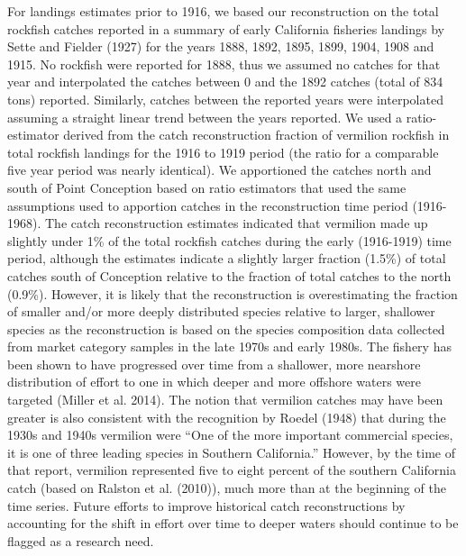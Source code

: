 \documentclass[11pt,
  english,
  a4paper,
]{article}
\begin{document}
For landings estimates prior to 1916, we based our reconstruction on the total rockfish catches reported in a summary of early California fisheries landings by Sette and Fielder {(1927)\leavevmode\tagmcend\tagstructend} for the years 1888, 1892, 1895, 1899, 1904, 1908 and 1915. No rockfish were reported for 1888, thus we assumed no catches for that year and interpolated the catches between 0 and the 1892 catches (total of 834 tons) reported. Similarly, catches between the reported years were interpolated assuming a straight linear trend between the years reported. We used a ratio-estimator derived from the catch reconstruction fraction of vermilion rockfish in total rockfish landings for the 1916 to 1919 period (the ratio for a comparable five year period was nearly identical). We apportioned the catches north and south of Point Conception based on ratio estimators that used the same assumptions used to apportion catches in the reconstruction time period (1916-1968). The catch reconstruction estimates indicated that vermilion made up slightly under 1\% of the total rockfish catches during the early (1916-1919) time period, although the estimates indicate a slightly larger fraction (1.5\%) of total catches south of Conception relative to the fraction of total catches to the north (0.9\%). However, it is likely that the reconstruction is overestimating the fraction of smaller and/or more deeply distributed species relative to larger, shallower species as the reconstruction is based on the species composition data collected from market category samples in the late 1970s and early 1980s. The fishery has been shown to have progressed over time from a shallower, more nearshore distribution of effort to one in which deeper and more offshore waters were targeted {(Miller et al. 2014)\leavevmode\tagmcend\tagstructend}. The notion that vermilion catches may have been greater is also consistent with the recognition by Roedel {(1948)\leavevmode\tagmcend\tagstructend} that during the 1930s and 1940s vermilion were ``One of the more important commercial species, it is one of three leading species in Southern California.'' However, by the time of that report, vermilion represented five to eight percent of the southern California catch (based on Ralston et al. {(2010)\leavevmode\tagmcend\tagstructend}), much more than at the beginning of the time series. Future efforts to improve historical catch reconstructions by accounting for the shift in effort over time to deeper waters should continue to be flagged as a research need.
\end{document}
